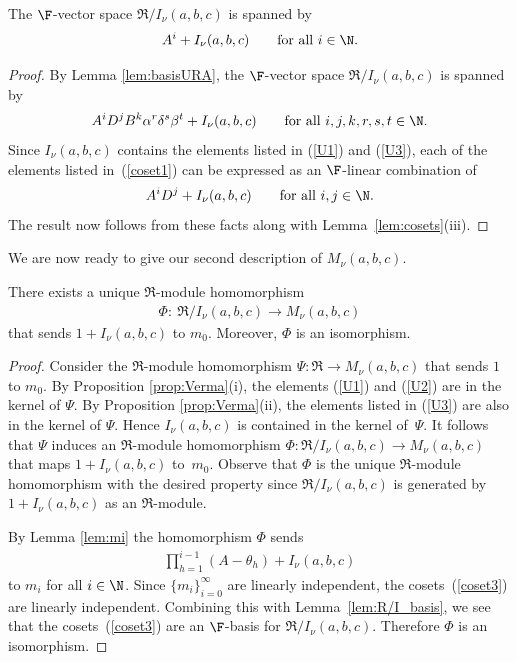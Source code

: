 \begin{Lemma}\label{lem:R/I_basis}The $\F$-vector space $\Re/I_\nu(a,b,c)$ is spanned by
\begin{gather*}
A^i+I_\nu(a,b,c) \qquad \hbox{for all $i\in \N$}.
\end{gather*}
\end{Lemma}
\begin{proof}By Lemma \ref{lem:basisURA}, the $\F$-vector space $\Re/I_\nu(a,b,c)$ is spanned by
\begin{gather}\label{coset1}
A^i D^j B^k \alpha^r \delta^s \beta^t+I_\nu(a,b,c)\qquad \hbox{for all $i,j,k,r,s,t\in \N$}.
\end{gather}
Since $I_\nu(a,b,c)$ contains the elements listed in (\ref{U1}) and (\ref{U3}), each of the elements listed in~(\ref{coset1}) can be expressed as an $\F$-linear combination of
\begin{gather*}%
A^i D^j+I_\nu(a,b,c) \qquad \hbox{for all $i,j\in \N$}.
\end{gather*}
The result now follows from these facts along with Lemma~\ref{lem:cosets}(iii).
\end{proof}

We are now ready to give our second description of $M_\nu(a,b,c)$.

\begin{Theorem}\label{thm:M=R/I}There exists a unique $\Re$-module homomorphism
\begin{gather*}
\Phi\colon \ \Re/I_\nu(a,b,c)\to M_\nu(a,b,c)
\end{gather*}
that sends $1+I_\nu(a,b,c)$ to $m_0$. Moreover, $\Phi$ is an isomorphism.
\end{Theorem}
\begin{proof}Consider the $\Re$-module homomorphism $\Psi\colon \Re\to M_\nu(a,b,c)$ that sends $1$ to $m_0$. By Proposition \ref{prop:Verma}(i), the elements (\ref{U1}) and (\ref{U2}) are in the kernel of $\Psi$. By Proposition \ref{prop:Verma}(ii), the elements listed in (\ref{U3}) are also in the kernel of $\Psi$. Hence $I_\nu(a,b,c)$ is contained in the kernel of~$\Psi$. It follows that $\Psi$ induces an $\Re$-module homomorphism $\Phi\colon \Re/I_\nu(a,b,c) \to M_\nu(a,b,c)$ that maps $1+I_\nu(a,b,c)$ to~$m_0$. Observe that $\Phi$ is the unique $\Re$-module homomorphism with the desired property since $\Re/I_\nu(a,b,c)$ is generated by $1+I_\nu(a,b,c)$ as an $\Re$-module.

By Lemma \ref{lem:mi} the homomorphism $\Phi$ sends
\begin{gather}\label{coset3}
\prod_{h=1}^{i-1}(A-\theta_h)+I_\nu(a,b,c)
\end{gather}
to $m_i$ for all $i\in \N$. Since $\{m_i\}_{i=0}^\infty$ are linearly independent, the cosets~(\ref{coset3}) are linearly independent. Combining this with Lemma~\ref{lem:R/I_basis}, we see that the cosets~(\ref{coset3}) are an $\F$-basis for $\Re/I_\nu(a,b,c)$. Therefore $\Phi$ is an isomorphism.
\end{proof}

